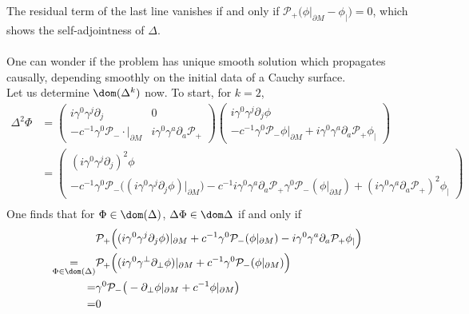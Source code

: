 The residual term of the last line vanishes if and only if $\mathcal{P}_+\big(\phi \vert_{\partial M} - \phi_|\big) = 0$, which shows the self-adjointness of $\Delta$. \\\\
One can wonder if the problem has unique smooth solution which propagates causally, \ie depending smoothly on the initial data of a Cauchy surface. \\
Let us determine $\dom (\Delta^k)$ now. 
To start, for $k =2$, 
\begin{equation}\label{wen-deltak}
\begin{split}
\Delta^2 \Phi & =  
\begin{pmatrix} i \gamma^0 \gamma^j \partial_j & 0 \\
- c^{-1} \gamma^0 \mathcal{P}_- \cdot \vert_{\partial M} & i \gamma^0 \gamma^a \partial_a \mathcal{P}_+ \end{pmatrix}
\begin{pmatrix}   i \gamma^0 \gamma^j \partial_j \phi \\
- c^{-1} \gamma^0 \mathcal{P}_- \phi\vert_{\partial M} + i \gamma^0 \gamma^a \partial_a \mathcal{P}_+ \phi_| \end{pmatrix} \\
&= 
\begin{pmatrix} (i\gamma^0\gamma^j\partial_j)^2 \phi \\
-c^{-1}\gamma^0\mathcal{P}_- \big( (i\gamma^0\gamma^j\partial_j \phi)\vert_{\partial M}\big)
-c^{-1}i \gamma^0\gamma^a\partial_a \mathcal{P}_+ \gamma^0 \mathcal{P}_-(\phi\vert_{\partial M})
+ (i\gamma^0\gamma^a\partial_a\mathcal{P}_+)^2\phi_| \end{pmatrix}
\\
\end{split}
\end{equation}
One finds that for $\Phi \in \dom(\Delta)$, $\Delta \Phi \in \dom \Delta$ if and only if
\begin{equation*}
\begin{split}
&\mathcal{P}_+\Big( ( i\gamma^0\gamma^j \partial_j \phi ) \vert_{\partial M} +
 c^{-1}\gamma^0 \mathcal{P}_- ( \phi \vert_{\partial M})
- i \gamma^0 \gamma^a \partial_a \mathcal{P}_+\phi _| \Big) \\
\underset{\Phi\in \dom(\Delta)}{ = }& 
\mathcal{P}_+\Big( (i\gamma^0\gamma^\bot \partial_\bot\phi)\vert_{\partial M} +
c^{-1}\gamma^0 \mathcal{P}_- ( \phi \vert_{\partial M}) \Big) \\ 
= & 
\gamma^0\mathcal{P}_-\big(- \partial_\bot \phi \vert_{\partial M} + c^{-1} \phi\vert_{\partial M}\big)
\\ = & 0
\end{split}
\end{equation*}
